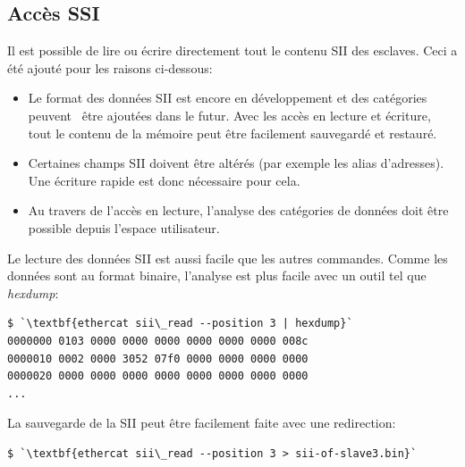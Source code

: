 \documentclass[a4paper,12pt,BCOR=6mm,bibtotoc,idxtotoc]{scrbook}
\begin{document}



\subsection{Acc\`es SSI}
\label{sec:siiaccess}

Il est possible de lire ou \'ecrire directement tout le contenu SII
des esclaves. Ceci a \'et\'e ajout\'e pour les raisons ci-dessous:

\begin{itemize}

\item Le format des donn\'ees SII est encore en d\'eveloppement et des
  cat\'egories peuvent \ \^etre ajout\'ees dans le futur.  Avec les
  acc\`es en lecture et \'ecriture, tout le contenu de la m\'emoire
  peut \^etre facilement sauvegard\'e et restaur\'e.

\item Certaines champs SII doivent \^etre alt\'er\'es (par exemple les
  alias d'adresses). Une \'ecriture rapide est donc n\'ecessaire pour
  cela.

\item Au travers de l'acc\`es en lecture, l'analyse des cat\'egories
  de donn\'ees doit \^etre possible depuis l'espace utilisateur.

\end{itemize}



Le lecture des donn\'ees SII est aussi facile que les autres commandes.
Comme les donn\'ees sont au format binaire,
l'analyse est plus facile avec un outil tel que \textit{hexdump}:

\begin{lstlisting}
$ `\textbf{ethercat sii\_read --position 3 | hexdump}`
0000000 0103 0000 0000 0000 0000 0000 0000 008c
0000010 0002 0000 3052 07f0 0000 0000 0000 0000
0000020 0000 0000 0000 0000 0000 0000 0000 0000
...
\end{lstlisting}

La sauvegarde de la SII peut \^etre facilement faite avec une redirection:

\begin{lstlisting}
$ `\textbf{ethercat sii\_read --position 3 > sii-of-slave3.bin}`
\end{lstlisting}
\end{document}
